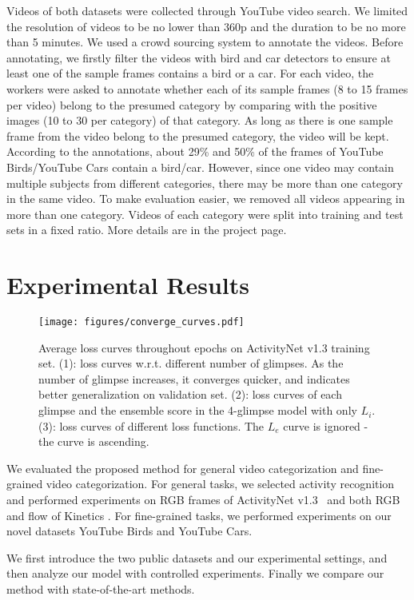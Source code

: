 \documentclass[runningheads]{llncs}
\begin{document}
Videos of both datasets were collected through YouTube video search. We limited the resolution of videos to be no lower than 360p and the duration to be no more than 5 minutes.
We used a crowd sourcing system to annotate the videos. Before annotating, we firstly filter the videos with bird and car detectors to ensure at least one of the sample frames contains a bird or a car. For each video, the workers were asked to annotate whether each of its sample frames (8 to 15 frames per video) belong to the presumed category by comparing with the positive images (10 to 30 per category) of that category. 
As long as there is one sample frame from the video belong to the presumed category, the video will be kept.
According to the annotations, about 29\% and 50\% of the frames of YouTube Birds/YouTube Cars contain a bird/car.
However, since one video may contain multiple subjects from different categories, there may be more than one category in the same video. To make evaluation easier, we removed all videos appearing in more than one category. Videos of each category were split into training and test sets in a fixed ratio. More details are in the project page.

 \section{Experimental Results}








\begin{figure*}
\centering
\texttt{[image: figures/converge\_curves.pdf]}
\caption{Average loss curves throughout epochs on ActivityNet v1.3 training set. (1): loss curves w.r.t. different number of glimpses. As the number of glimpse increases, it converges quicker, and indicates better generalization on validation set. (2): loss curves of each glimpse and the ensemble score in the 4-glimpse model with only $L_i$. (3): loss curves of different loss functions. The $L_e$ curve is ignored - the curve is ascending.}
\label{fig:loss_curve}
\end{figure*}
We evaluated the proposed method for general video categorization and fine-grained video categorization. For general tasks, we selected activity recognition and performed experiments on RGB frames of ActivityNet v1.3~\cite{caba2015activitynet} and both RGB and flow of Kinetics \cite{kay2017kinetics}. For fine-grained tasks, we performed experiments on our novel datasets YouTube Birds and YouTube Cars.\par
We first introduce the two public datasets and our experimental settings, and then analyze our model with controlled experiments. Finally we compare our method with state-of-the-art methods.
\end{document}
